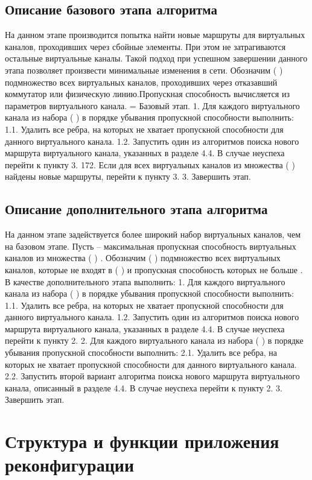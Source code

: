\documentclass[12pt, a4paper]{article}
\begin{document}
\subsection{Описание базового этапа алгоритма}
На данном этапе производится попытка найти новые маршруты для виртуальных
каналов, проходивших через сбойные элементы. При этом не затрагиваются остальные
виртуальные каналы. Такой подход при успешном завершении данного этапа позволяет
произвести минимальные изменения в сети.
Обозначим ( ) подмножество всех виртуальных каналов, проходивших через
отказавший коммутатор или физическую линию.Пропускная способность
вычисляется
из параметров виртуального канала.
=
Базовый этап.
1. Для каждого виртуального канала из набора ( ) в порядке убывания пропускной
способности выполнить:
1.1. Удалить все ребра, на которых не хватает пропускной способности для данного
виртуального канала.
1.2. Запустить один из алгоритмов поиска нового маршрута виртуального канала,
указанных в разделе 4.4. В случае неуспеха перейти к пункту 3.
172. Если для всех виртуальных каналов из множества ( ) найдены новые маршруты,
перейти к пункту 3.
3. Завершить этап.

\subsection{Описание дополнительного этапа алгоритма}
На данном этапе задействуется более широкий набор виртуальных каналов, чем на
базовом этапе.
Пусть
– максимальная пропускная способность виртуальных каналов из
множества ( ) .
Обозначим ( ) подмножество всех виртуальных каналов, которые не входят в ( ) и
пропускная способность которых не больше
.
В качестве дополнительного этапа выполнить:
1. Для каждого виртуального канала из набора ( ) в порядке убывания пропускной
способности выполнить:
1.1. Удалить все ребра, на которых не хватает пропускной способности для данного
виртуального канала.
1.2. Запустить один из алгоритмов поиска нового маршрута виртуального канала,
указанных в разделе 4.4. В случае неуспеха перейти к пункту 2.
2. Для каждого виртуального канала из набора ( ) в порядке убывания пропускной
способности выполнить:
2.1. Удалить все ребра, на которых не хватает пропускной способности для данного
виртуального канала.
2.2. Запустить второй вариант алгоритма поиска нового маршрута виртуального
канала, описанный в разделе 4.4. В случае неуспеха перейти к пункту 2.
3. Завершить этап.


\section{Структура и функции приложения реконфигурации}
\end{document}

